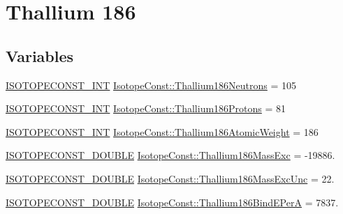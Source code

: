 \hypertarget{group___isotope_const-_thallium-_tl186}{}\section{Thallium 186}
\label{group___isotope_const-_thallium-_tl186}
\subsection*{Variables}
\begin{DoxyCompactItemize}
\item 
\mbox{\hyperlink{group___isotope_const-_macros_ga5f18360b3e99483a35c32d789e62621c}{I\+S\+O\+T\+O\+P\+E\+C\+O\+N\+S\+T\+\_\+\+I\+NT}} \mbox{\hyperlink{group___isotope_const-_thallium-_tl186_ga20395238fddec3f93cc23c3eccd62a52}{Isotope\+Const\+::\+Thallium186\+Neutrons}} = 105
\item 
\mbox{\hyperlink{group___isotope_const-_macros_ga5f18360b3e99483a35c32d789e62621c}{I\+S\+O\+T\+O\+P\+E\+C\+O\+N\+S\+T\+\_\+\+I\+NT}} \mbox{\hyperlink{group___isotope_const-_thallium-_tl186_ga8c5be8ee75e662d742edf7b31061f5e0}{Isotope\+Const\+::\+Thallium186\+Protons}} = 81
\item 
\mbox{\hyperlink{group___isotope_const-_macros_ga5f18360b3e99483a35c32d789e62621c}{I\+S\+O\+T\+O\+P\+E\+C\+O\+N\+S\+T\+\_\+\+I\+NT}} \mbox{\hyperlink{group___isotope_const-_thallium-_tl186_ga3efc1734d2ae6acbe51c147bb81b8708}{Isotope\+Const\+::\+Thallium186\+Atomic\+Weight}} = 186
\item 
\mbox{\hyperlink{group___isotope_const-_macros_ga8f45a7272ce02c0b4c65c44636ed719a}{I\+S\+O\+T\+O\+P\+E\+C\+O\+N\+S\+T\+\_\+\+D\+O\+U\+B\+LE}} \mbox{\hyperlink{group___isotope_const-_thallium-_tl186_ga72cbb5be273aaec787682a980030976b}{Isotope\+Const\+::\+Thallium186\+Mass\+Exc}} = -\/19886.
\item 
\mbox{\hyperlink{group___isotope_const-_macros_ga8f45a7272ce02c0b4c65c44636ed719a}{I\+S\+O\+T\+O\+P\+E\+C\+O\+N\+S\+T\+\_\+\+D\+O\+U\+B\+LE}} \mbox{\hyperlink{group___isotope_const-_thallium-_tl186_ga24cec4d4860b3b6985937b275e7ec84d}{Isotope\+Const\+::\+Thallium186\+Mass\+Exc\+Unc}} = 22.
\item 
\mbox{\hyperlink{group___isotope_const-_macros_ga8f45a7272ce02c0b4c65c44636ed719a}{I\+S\+O\+T\+O\+P\+E\+C\+O\+N\+S\+T\+\_\+\+D\+O\+U\+B\+LE}} \mbox{\hyperlink{group___isotope_const-_thallium-_tl186_gad47740b38747a1257e2520d19a553caa}{Isotope\+Const\+::\+Thallium186\+Bind\+E\+PerA}} = 7837.
\item 

\end{DoxyCompactItemize}
